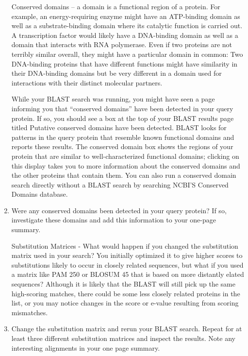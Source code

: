 \begin{enumerate}
Conserved domains – a domain is a functional region of a protein.  For example, an energy-requiring enzyme might have an ATP-binding domain as well as a substrate-binding domain where its catalytic function is carried out.  A transcription factor would likely have a DNA-binding domain as well as a domain that interacts with RNA polymerase.  Even if two proteins are not terribly similar overall, they might have a particular domain in common:  Two DNA-binding proteins that have different functions might have similarity in their DNA-binding domains but be very different in a domain used for interactions with their distinct molecular partners.

While your BLAST search was running, you might have seen a page informing you that ``conserved domains'' have been detected in your query protein.  If so, you should see a box at the top of your BLAST results page titled Putative conserved domains have been detected.  BLAST looks for patterns in the query protein that resemble known functional domains and reports these results.  The conserved domain box shows the regions of your protein that are similar to well-characterized functional domains; clicking on this display takes you to more information about the conserved domains and the other proteins that contain them.  You can also run a conserved domain search directly without a BLAST search by searching NCBI’S Conserved Domains database.

	\item Were any conserved domains been detected in your query protein?  If so, investigate these domains and add this information to your one-page summary.
	
Substitution Matrices - What would happen if you changed the substitution matrix used in your search?  You initially optimized it to give higher scores to substitutions likely to occur in closely related sequences, but what if you used a matrix like PAM 250 or BLOSUM 45 that is based on more distantly elated sequences?  Although it is likely that the BLAST will still pick up the same high-scoring matches, there could be some less closely related proteins in the list, or you may notice changes in the score or e-value resulting from scoring mismatches.  

	\item  Change the substitution matrix and rerun your BLAST search.  Repeat for at least three different substitution matrices and inspect the results.  Note any interesting alignments in your one page summary.
	

\end{enumerate}
